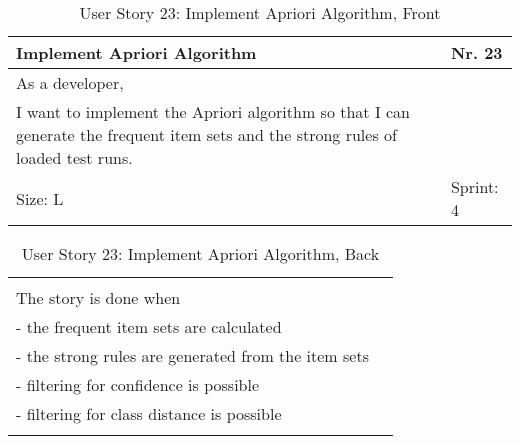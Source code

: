 \begin{table}[H]
  \caption{User Story 23: Implement Apriori Algorithm, Front}
  \label{Story_23_Front}
  \centering
  \begin{tabular}{|p{9cm} p{2cm}|}
	\hline  	
  	Implement Apriori Algorithm & Nr. 23 \\ 
  	\hline
  	As a developer, &    \\ 
  	I want to implement the Apriori algorithm so that I can generate the frequent item sets and the strong rules of loaded test runs. &    \\ 
  	Size: L & Sprint: 4 \\ 
  	\hline
  \end{tabular}
\end{table}
\begin{table}[H]
  \caption{User Story 23: Implement Apriori Algorithm, Back}
  \label{Story_23_Back}
  \centering
  \begin{tabular}{|p{10cm} p{1cm}|}
  \hline
  	  &    \\ 
  	The story is done when &    \\ 
  	 - the frequent item sets are calculated & \\ 
  	 - the strong rules are generated from the item sets & \\ 
  	 - filtering for confidence is possible & \\ 
  	 - filtering for class distance is possible & \\ 
  	 
  	  &  
  	   \\ 
  	\hline
  \end{tabular}
\end{table}

\ \\ 

